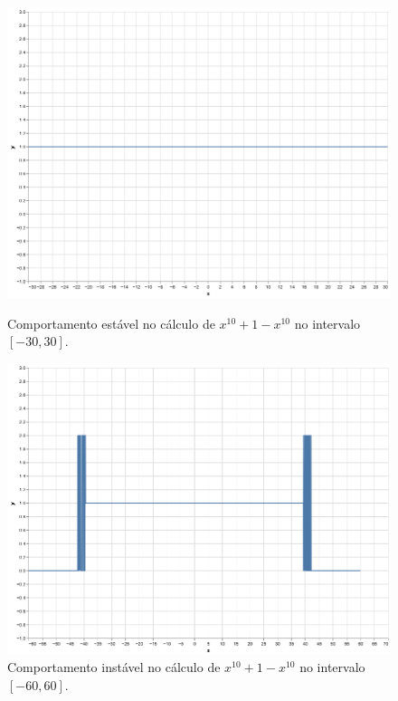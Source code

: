 \begin{figure}[h]
    \centering
    \begin{minipage}{0.48\textwidth}
        \centering
        \includegraphics[width=\textwidth]{Imagens/x10_estavel.png}
        \caption{Comportamento estável no cálculo de \(x^{10} + 1 - x^{10}\) no intervalo \([-30, 30]\).}
        \label{fig:estavel}
    \end{minipage}
    \hfill
    \begin{minipage}{0.48\textwidth}
        \centering
        \includegraphics[width=\textwidth]{Imagens/x10_instavel.png}
        \caption{Comportamento instável no cálculo de \(x^{10} + 1 - x^{10}\) no intervalo \([-60, 60]\).}
        \label{fig:instavel}
    \end{minipage}
\end{figure}


